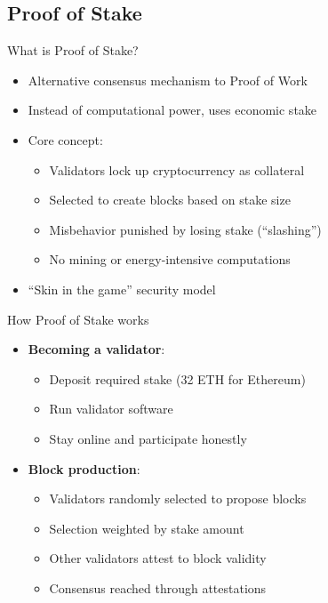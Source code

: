 \documentclass[aspectratio=169, lualatex, handout]{beamer}
\begin{document}
\subsection{Proof of Stake}

\begin{frame}{What is Proof of Stake?}
	\begin{itemize}
		\item Alternative consensus mechanism to Proof of Work
		\item Instead of computational power, uses economic stake
		\item Core concept:
		      \begin{itemize}
			      \item Validators lock up cryptocurrency as collateral
			      \item Selected to create blocks based on stake size
			      \item Misbehavior punished by losing stake (``slashing'')
			      \item No mining or energy-intensive computations
		      \end{itemize}
		\item ``Skin in the game'' security model
	\end{itemize}
\end{frame}

\begin{frame}{How Proof of Stake works}
	\begin{itemize}
		\item \textbf{Becoming a validator}:
		      \begin{itemize}
			      \item Deposit required stake (32 ETH for Ethereum)
			      \item Run validator software
			      \item Stay online and participate honestly
		      \end{itemize}
		\item \textbf{Block production}:
		      \begin{itemize}
			      \item Validators randomly selected to propose blocks
			      \item Selection weighted by stake amount
			      \item Other validators attest to block validity
			      \item Consensus reached through attestations
		      \end{itemize}
	\end{itemize}
\end{frame}
\end{document}
